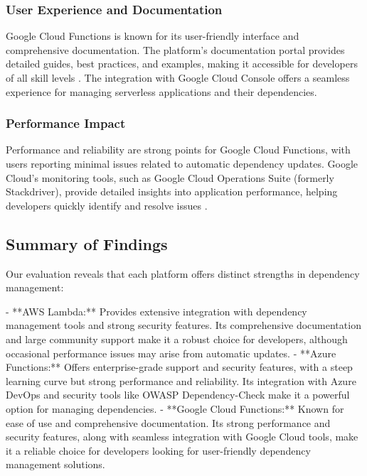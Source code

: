 \documentclass[sigconf]{acmart}
\begin{document}
\subsubsection{User Experience and Documentation}

Google Cloud Functions is known for its user-friendly interface and comprehensive documentation. The platform's documentation portal provides detailed guides, best practices, and examples, making it accessible for developers of all skill levels \cite{googleDocs2023}. The integration with Google Cloud Console offers a seamless experience for managing serverless applications and their dependencies.

\subsubsection{Performance Impact}

Performance and reliability are strong points for Google Cloud Functions, with users reporting minimal issues related to automatic dependency updates. Google Cloud's monitoring tools, such as Google Cloud Operations Suite (formerly Stackdriver), provide detailed insights into application performance, helping developers quickly identify and resolve issues \cite{googlePerformance2023}.

\subsection{Summary of Findings}

Our evaluation reveals that each platform offers distinct strengths in dependency management:

- **AWS Lambda:** Provides extensive integration with dependency management tools and strong security features. Its comprehensive documentation and large community support make it a robust choice for developers, although occasional performance issues may arise from automatic updates.
- **Azure Functions:** Offers enterprise-grade support and security features, with a steep learning curve but strong performance and reliability. Its integration with Azure DevOps and security tools like OWASP Dependency-Check make it a powerful option for managing dependencies.
- **Google Cloud Functions:** Known for ease of use and comprehensive documentation. Its strong performance and security features, along with seamless integration with Google Cloud tools, make it a reliable choice for developers looking for user-friendly dependency management solutions.
\end{document}

